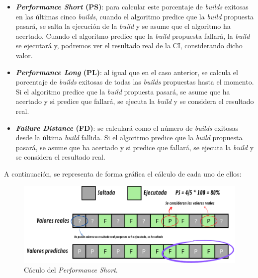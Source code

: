 \begin{itemize}
    \item \textbf{\textit{Performance Short} (PS)}: para calcular este porcentaje de \textit{builds}
    exitosas en las últimas cinco \textit{builds}, cuando el algoritmo predice que la \textit{build}
    propuesta pasará, se salta la ejecución de la \textit{build} y se asume que el algoritmo ha
    acertado. Cuando el algoritmo predice que la \textit{build} propuesta fallará, la \textit{build}
    se ejecutará y, podremos ver el resultado real de la CI, considerando dicho valor.\\

    \item \textbf{\textit{Performance Long} (PL)}: al igual que en el caso anterior, se calcula el
    porcentaje de \textit{builds} exitosas de todas las \textit{builds} propuestas hasta el momento.
    Si el algoritmo predice que la \textit{build} propuesta pasará, se asume que ha acertado y si
    predice que fallará, se ejecuta la \textit{build} y se considera el resultado real.\\

    \item \textbf{\textit{Failure Distance} (FD)}: se calculará como el número de \textit{builds}
    exitosas desde la última \textit{build} fallida. Si el algoritmo predice que la \textit{build}
    propuesta pasará, se asume que ha acertado y si predice que fallará, se ejecuta la
    \textit{build} y se considera el resultado real.\\

\end{itemize}

\noindent A continuación, se representa de forma gráfica el cálculo de cada uno de ellos:

\begin{figure}[H]
    \centering
    \includegraphics[scale=0.9]{images/PS.pdf}
    \caption{Cáculo del \textit{Performance Short}.}
    \label{fig:PS}
\end{figure}

